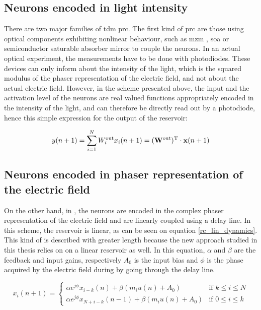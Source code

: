 
\subsection{Neurons encoded in light intensity}

There are two major families of \gls{tdm} \gls{prc}. The first kind of \gls{prc} are those using optical components exhibiting nonlinear behaviour, such as \gls{mzm} \cite{Duport2016, Paquot2012, Antonik2017}, \gls{soa} \cite{Vandoorne2008} or semiconductor saturable absorber mirror \cite{Dejonckheere2014} to couple the neurons. In an actual optical experiment, the measurements have to be done with photodiodes. These devices can only inform about the intensity of the light, which is the squared modulus of the phaser representation of the electric field, and not about the actual electric field. However, in the scheme presented above, the input and the activation level of the neurons are real valued functions appropriately encoded in the intensity of the light, and can therefore be directly read out by a photodiode, hence this simple expression for the output of the reservoir:

\begin{equation}
	y(n+1) = \sum_{i=1}^{N} W^{\text{out}}_i x_i (n+1) = (\mathbf{W}^{\text{out}})^{\text{T}} \cdot \mathbf{x}(n+1)
	\label{lin_output_rc}
\end{equation}


\subsection{Neurons encoded in phaser representation of the electric field}

On the other hand, in \cite{Vinckier2015}, the neurons are encoded in the complex phaser representation of the electric field and are linearly coupled using a delay line. In this scheme, the reservoir is linear, as can be seen on equation \eqref{rc_lin_dynamics}. This kind of \rcer is described with greater length because the new approach studied in this thesis relies on on a linear reservoir as well. In this equation, $\alpha$ and $\beta$ are the feedback and input gains, respectively $A_0$ is the input bias and $\phi$ is the phase acquired by the electric field during by going through the delay line.

\begin{equation}
	x_i(n+1) = 
	\begin{cases}
		\alpha e^{j\phi} x_{i-k}(n)+\beta \left(m_i u(n) +A_0 \right) & \text{if } k \leq i \leq N\\
		\alpha e^{j\phi} x_{N+i-k}(n-1)+\beta \left(m_i u(n) +A_0 \right) & \text{if } 0 \leq i \leq k			
	\end{cases}
	\label{rc_lin_dynamics}
\end{equation}

